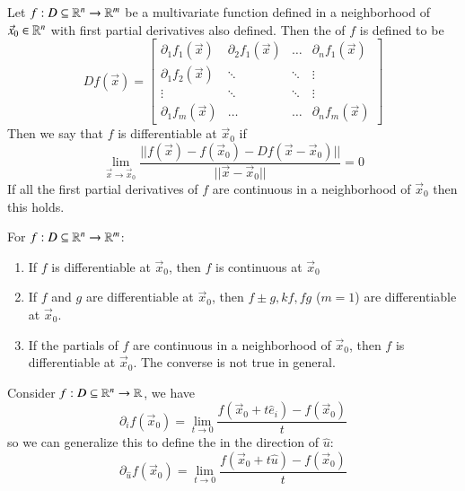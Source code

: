 \begin{appendices}
    \begin{defn}
        Let $f:D\subseteq \mathbb R^n\rightarrow \mathbb R^m$ be a multivariate function defined in a neighborhood of $\vec{x}_0 \in \mathbb R^n$ with first partial derivatives also defined. Then the  of $f$ is defined to be \begin{equation}
            Df(\vec{x}) = \begin{bmatrix} \partial_1f_1(\vec{x}) & \partial_2f_1(\vec{x}) & \hdots & \partial_nf_1(\vec{x}) \\
                \partial_1f_2(\vec{x}) & \ddots & \ddots & \vdots \\
                \vdots & \ddots & \ddots & \vdots \\
                \partial_1f_m(\vec{x}) & \hdots & \hdots & \partial_nf_m(\vec{x})
            \end{bmatrix}
        \end{equation}
        Then we say that $f$ is differentiable at $\vec{x}_0$ if \begin{equation}
            \lim_{\vec{x}\rightarrow \vec{x}_0}\frac{||f(\vec{x}) - f(\vec{x}_0) - Df(\vec{x} - \vec{x}_0)||}{||\vec{x} - \vec{x}_0||} = 0
        \end{equation}
        If all the first partial derivatives of $f$ are continuous in a neighborhood of $\vec{x}_0$ then this holds.
    \end{defn}


    \begin{rmk}[Properties]
        For $f:D \subseteq \mathbb R^n\rightarrow \mathbb R^m$: \begin{enumerate}
            \item If $f$ is differentiable at $\vec{x}_0$, then $f$ is continuous at $\vec{x}_0$
            \item If $f$ and $g$ are differentiable at $\vec{x}_0$, then $f\pm g, kf, fg$ ($m = 1$) are differentiable at $\vec{x}_0$.
            \item If the partials of $f$ are continuous in a neighborhood of $\vec{x}_0$, then $f$ is differentiable at $\vec{x}_0$. The converse is not true in general.
        \end{enumerate}
    \end{rmk}

    \begin{defn}
        Consider $f:D\subseteq \mathbb R^n\rightarrow \mathbb R$, we have \begin{equation}
            \partial_if(\vec{x}_0) = \lim_{t\rightarrow 0}\frac{f(\vec{x}_0+t\hat{e}_i) - f(\vec{x}_0)}{t}
        \end{equation}
        so we can generalize this to define the  in the direction of $\hat{u}$: \begin{equation}
            \partial_{\hat{u}}f(\vec{x}_0) = \lim_{t\rightarrow 0}\frac{f(\vec{x}_0+t\hat{u}) - f(\vec{x}_0)}{t}
        \end{equation}
    \end{defn}


\end{appendices}
